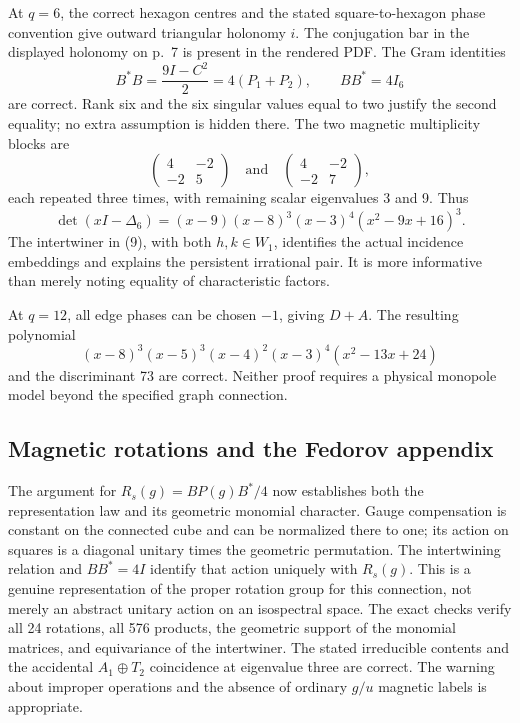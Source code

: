 \documentclass[11pt,a4paper]{article}
\begin{document}
At $q=6$, the correct hexagon centres and the stated square-to-hexagon phase convention give outward triangular holonomy $i$. The conjugation bar in the displayed holonomy on p.~7 is present in the rendered PDF. The Gram identities
\[
B^*B=\frac{9I-C^2}{2}=4(P_1+P_2),\qquad BB^*=4I_6
\]
are correct. Rank six and the six singular values equal to two justify the second equality; no extra assumption is hidden there. The two magnetic multiplicity blocks are
\[
\begin{pmatrix}4&-2\\-2&5\end{pmatrix}\quad\text{and}\quad
\begin{pmatrix}4&-2\\-2&7\end{pmatrix},
\]
each repeated three times, with remaining scalar eigenvalues 3 and 9. Thus
\[
\det(xI-\Delta_6)=(x-9)(x-8)^3(x-3)^4(x^2-9x+16)^3.
\]
The intertwiner in (9), with both $h,k\in W_1$, identifies the actual incidence embeddings and explains the persistent irrational pair. It is more informative than merely noting equality of characteristic factors.

At $q=12$, all edge phases can be chosen $-1$, giving $D+A$. The resulting polynomial
\[
(x-8)^3(x-5)^3(x-4)^2(x-3)^4(x^2-13x+24)
\]
and the discriminant 73 are correct. Neither proof requires a physical monopole model beyond the specified graph connection.

\subsection{Magnetic rotations and the Fedorov appendix}
The argument for $R_s(g)=BP(g)B^*/4$ now establishes both the representation law and its geometric monomial character. Gauge compensation is constant on the connected cube and can be normalized there to one; its action on squares is a diagonal unitary times the geometric permutation. The intertwining relation and $BB^*=4I$ identify that action uniquely with $R_s(g)$. This is a genuine representation of the proper rotation group for this connection, not merely an abstract unitary action on an isospectral space. The exact checks verify all 24 rotations, all 576 products, the geometric support of the monomial matrices, and equivariance of the intertwiner. The stated irreducible contents and the accidental $A_1\oplus T_2$ coincidence at eigenvalue three are correct. The warning about improper operations and the absence of ordinary $g/u$ magnetic labels is appropriate.
\end{document}
